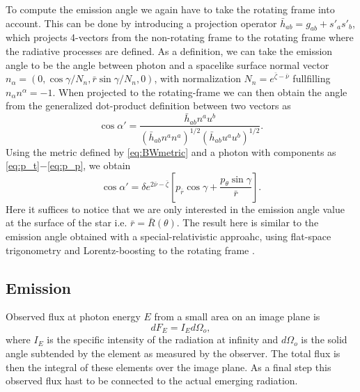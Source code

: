 \documentclass[iop, usenatbib]{emulateapj}
\newcommand{\be}{\begin{equation}}
\newcommand{\ee}{\end{equation}}
\newcommand{\rb}{\ensuremath{\bar{r}}}
\newcommand{\nub}{\ensuremath{\bar{\nu}}}
\newcommand{\zetab}{\ensuremath{\bar{\zeta}}}
\begin{document}
To compute the emission angle we again have to take the rotating frame
into account.  This can be done by introducing a projection operator
$\bar{h}_{ab} = g_{ab} + s'_a s'_b$, which projects 4-vectors from the
non-rotating frame to the rotating frame where the radiative processes
are defined.  As a definition, we can take the emission angle to be the
angle between photon and a spacelike surface normal vector $n_{\alpha} =
(0, \cos\gamma/N_n, \rb \sin\gamma/N_n, 0)$, with normalization $N_n =
e^{\zetab - \nub}$ fullfilling $n_{\alpha}n^{\alpha} = -1$.  When
projected to the rotating-frame we can then obtain the angle from the
generalized dot-product definition between two vectors as
\be\label{eq:gen_angle}
\cos\alpha' = \frac{\bar{h}_{ab}n^a u^b}{(\bar{h}_{ab} n^a n^a)^{1/2} (\bar{h}_{ab} u^a u^b)^{1/2}}.
\ee
Using the metric defined by \eqref{eq:BWmetric} and a photon with components as \eqref{eq:p_t}$-$\eqref{eq:p_p}, we obtain
\be
\cos\alpha' = \delta e^{2\nub-\zetab} \left[ p_{\rb} \cos\gamma + \frac{p_{\theta} \sin\gamma}{\rb} \right].
\ee
Here it suffices to notice that we are only interested in the emission angle value at the surface of the star i.e. $\rb = \bar{R}(\theta)$.
The result here is similar to the emission angle obtained with a
special-relativistic approahc, using flat-space trigonometry and
Lorentz-boosting to the rotating frame \citep[see e.g.][]{PB06}.

\subsection{Emission}
Observed flux at photon energy $E$ from a small area on an image plane is
\be
dF_E = I_E d\Omega_o,
\ee
where $I_E$ is the specific intensity of the radiation at infinity and
$d\Omega_o$ is the solid angle subtended by the element as measured by
the observer. The total flux is then
the integral of these elements over the image plane. As a
final step this observed flux hast to be connected to the actual
emerging radiation.
\end{document}
